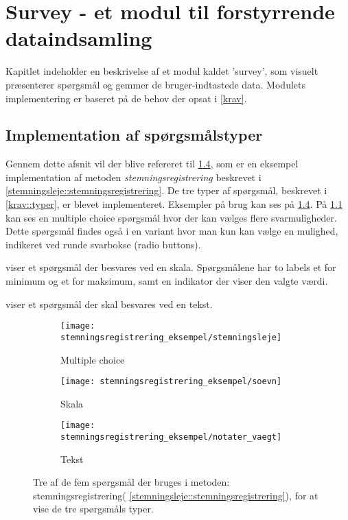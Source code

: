 \chapter{Survey - et modul til forstyrrende dataindsamling}
Kapitlet indeholder en beskrivelse af et modul kaldet 'survey', som visuelt præsenterer spørgsmål og gemmer de bruger-indtastede data.
Modulets implementering er baseret på de behov der opsat i \cref{krav}.

\section{Implementation af spørgsmålstyper}\label{survey:spg}
Gennem dette afsnit vil der blive refereret til \cref{stemreg::spoergsmaal}, som er en eksempel implementation af metoden  \emph{stemningsregistrering} beskrevet i \cref{stemningsleje::stemningsregistrering}.
De tre typer af spørgsmål, beskrevet i \cref{krav::typer}, er blevet implementeret.
Eksempler på brug kan ses på \cref{stemreg::spoergsmaal}.
På \cref{stemreg::stemningsleje} kan ses en multiple choice spørgsmål hvor der kan vælges flere svarmuligheder.
Dette spørgsmål findes også i en variant hvor man kun kan vælge en mulighed, indikeret ved runde svarbokse (radio buttons).

 viser et spørgsmål der besvares ved en skala. 
Spørgsmålene har to labels et for minimum og et for maksimum, samt en indikator der viser den valgte værdi.

 viser et spørgsmål der skal besvares ved en tekst. 


\begin{figure}
	\centering
	\begin{subfigure}[b]{0.45\textwidth}
		\texttt{[image: stemningsregistrering\_eksempel/stemningsleje]}
		\caption{Multiple choice}\label{stemreg::stemningsleje}
	\end{subfigure}
	\hfill
\begin{minipage}[b]{0.45\textwidth}
	\begin{subfigure}[b]{\textwidth}
		\texttt{[image: stemningsregistrering\_eksempel/soevn]}
		\caption{Skala}\label{stemreg::soevn}
	\end{subfigure}
	\newline 
	\begin{subfigure}[b]{\textwidth}
		\texttt{[image: stemningsregistrering\_eksempel/notater\_vaegt]}
		\caption{Tekst}\label{stemreg::notater_vaegt}
	\end{subfigure}	
\end{minipage}	
	\caption{Tre af de fem spørgsmål der bruges i metoden: stemningsregistrering( \cref{stemningsleje::stemningsregistrering}), for at vise de tre spørgsmåls typer.}\label{stemreg::spoergsmaal}
\end{figure}

